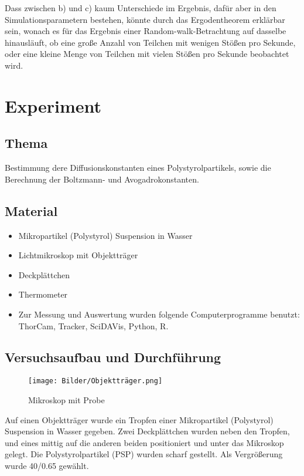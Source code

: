 \documentclass[class=article, crop=false]{standalone}
\begin{document}
Dass zwischen b) und c) kaum Unterschiede im Ergebnis, dafür aber in den
Simulationsparametern bestehen, könnte durch das Ergodentheorem
erklärbar sein, wonach es für das Ergebnis einer Random-walk-Betrachtung
auf dasselbe hinausläuft, ob eine große Anzahl von Teilchen mit wenigen
Stößen pro Sekunde, oder eine kleine Menge von Teilchen mit vielen
Stößen pro Sekunde beobachtet wird.

\hypertarget{experiment}{%
\section{Experiment}\label{experiment}}

\hypertarget{thema}{%
\subsection{Thema}\label{thema}}

Bestimmung dere Diffusionskonstanten eines Polystyrolpartikels, sowie
die Berechnung der Boltzmann- und Avogadrokonstanten.

\hypertarget{material}{%
\subsection{Material}\label{material}}

\begin{itemize}
\item{Mikropartikel (Polystyrol) Suspension in Wasser}
\item{Lichtmikroskop mit Objektträger}
\item{Deckplättchen}
\item{Thermometer}
\item{Zur Messung und Auswertung wurden folgende Computerprogramme benutzt: ThorCam, Tracker, SciDAVis, Python, R.}
\end{itemize}

\hypertarget{versuchsaufbau-und-durchfuxfchrung}{%
\subsection{Versuchsaufbau und
Durchführung}\label{versuchsaufbau-und-durchfuxfchrung}}

\begin{figure}
\centering
\texttt{[image: Bilder/Objektträger.png]}
\caption{Mikroskop mit Probe}
\end{figure}

Auf einen Objektträger wurde ein Tropfen einer Mikropartikel
(Polystyrol) Suspension in Wasser gegeben. Zwei Deckplättchen wurden
neben den Tropfen, und eines mittig auf die anderen beiden positioniert
und unter das Mikroskop gelegt. Die Polystyrolpartikel (PSP) wurden
scharf gestellt. Als Vergrößerung wurde 40/0.65 gewählt.
\end{document}
